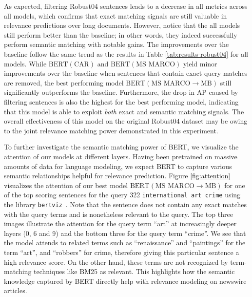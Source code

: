 As expected, filtering Robust04 sentences leads to a decrease in all metrics across all models, which confirms that exact matching signals are still valuable in relevance predictions over long documents.
However, notice that the all models still perform better than the baseline; in other words, they indeed successfully perform semantic matching with notable gains.
The improvements over the baseline follow the same trend as the results in Table \ref{tab:results-robust04} for all models.
While $ \textrm{BERT} (\textrm{CAR}) $ and $ \textrm{BERT} (\textrm{MS MARCO}) $ yield minor improvements over the baseline when sentences that contain exact query matches are removed, the best performing model $ \textrm{BERT} (\textrm{MS MARCO}\rightarrow\textrm{MB}) $ still significantly outperforms the baseline.
Furthermore, the drop in AP caused by filtering sentences is also the highest for the best performing model, indicating that this model is able to exploit \textit{both} exact and semantic matching signals.
The overall effectiveness of this model on the original Robust04 dataset may be owing to the joint relevance matching power demonstrated in this experiment.

To further investigate the semantic matching power of BERT, we visualize the attention of our models at different layers.
Having been pretrained on massive amounts of data for language modeling, we expect BERT to capture various semantic relationships helpful for relevance prediction.
Figure \ref{fig:attention} visualizes the attention of our best model $ \textrm{BERT} (\textrm{MS MARCO}\rightarrow\textrm{MB}) $ for one of the top scoring sentences for the query 322 \texttt{international art crime} using the library \texttt{bertviz}~\cite{vig2019multiscale}.
Note that the sentence does not contain any exact matches with the query terms and is nonetheless relevant to the query.
The top three images illustrate the attention for the query term ``art'' at increasingly deeper layers (0, 6 and 9) and the bottom three for the query term ``crime''.
We see that the model attends to related terms such as ``renaissance'' and ``paintings'' for the term ``art'', and ``robbers'' for crime, therefore giving this particular sentence a high relevance score.
On the other hand, these terms are not recognized by term-matching techniques like BM25 as relevant.
This highlights how the semantic knowledge captured by BERT directly help with relevance modeling on newswire articles.


